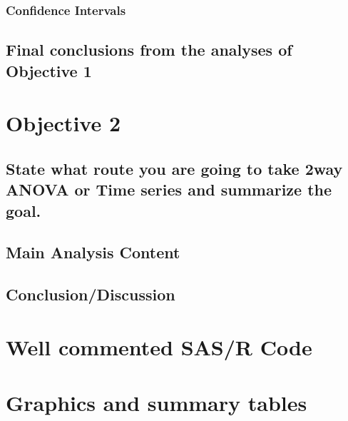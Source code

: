 \documentclass[acmsmall]{acmart}
\begin{document}
\subsubsection{Confidence Intervals}
\subsection{Final conclusions from the analyses of Objective 1}
\section{Objective 2}
\subsection{State what route you are going to take 2way ANOVA or Time series and summarize the goal.}
\subsection{Main Analysis Content }
\subsection{Conclusion/Discussion}
\appendix{} 
\section{Well commented SAS/R Code}
\section{Graphics and summary tables}

\end{document}
